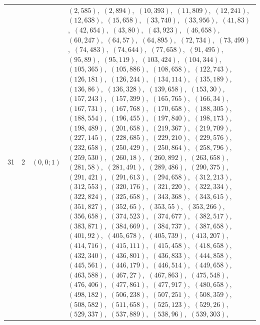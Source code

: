 \documentclass[11pt]{article}
\begin{document}
\begin{longtable}{@{}rrl>{\raggedright\arraybackslash}p{}@{}}
31 & 2 & $(0,0;1)$ & $(2,585)$,\allowbreak\ $(2,894)$,\allowbreak\ $(10,393)$,\allowbreak\ $(11,809)$,\allowbreak\ $(12,241)$,\allowbreak\ $(12,638)$,\allowbreak\ $(15,658)$,\allowbreak\ $(33,740)$,\allowbreak\ $(33,956)$,\allowbreak\ $(41,83)$,\allowbreak\ $(42,654)$,\allowbreak\ $(43,80)$,\allowbreak\ $(43,923)$,\allowbreak\ $(46,658)$,\allowbreak\ $(60,247)$,\allowbreak\ $(64,57)$,\allowbreak\ $(64,895)$,\allowbreak\ $(72,734)$,\allowbreak\ $(73,499)$,\allowbreak\ $(74,483)$,\allowbreak\ $(74,644)$,\allowbreak\ $(77,658)$,\allowbreak\ $(91,495)$,\allowbreak\ $(95,89)$,\allowbreak\ $(95,119)$,\allowbreak\ $(103,424)$,\allowbreak\ $(104,344)$,\allowbreak\ $(105,365)$,\allowbreak\ $(105,886)$,\allowbreak\ $(108,658)$,\allowbreak\ $(122,743)$,\allowbreak\ $(126,181)$,\allowbreak\ $(126,244)$,\allowbreak\ $(134,114)$,\allowbreak\ $(135,189)$,\allowbreak\ $(136,86)$,\allowbreak\ $(136,328)$,\allowbreak\ $(139,658)$,\allowbreak\ $(153,30)$,\allowbreak\ $(157,243)$,\allowbreak\ $(157,399)$,\allowbreak\ $(165,765)$,\allowbreak\ $(166,34)$,\allowbreak\ $(167,731)$,\allowbreak\ $(167,768)$,\allowbreak\ $(170,658)$,\allowbreak\ $(188,305)$,\allowbreak\ $(188,554)$,\allowbreak\ $(196,455)$,\allowbreak\ $(197,840)$,\allowbreak\ $(198,173)$,\allowbreak\ $(198,489)$,\allowbreak\ $(201,658)$,\allowbreak\ $(219,367)$,\allowbreak\ $(219,709)$,\allowbreak\ $(227,145)$,\allowbreak\ $(228,685)$,\allowbreak\ $(229,210)$,\allowbreak\ $(229,576)$,\allowbreak\ $(232,658)$,\allowbreak\ $(250,429)$,\allowbreak\ $(250,864)$,\allowbreak\ $(258,796)$,\allowbreak\ $(259,530)$,\allowbreak\ $(260,18)$,\allowbreak\ $(260,892)$,\allowbreak\ $(263,658)$,\allowbreak\ $(281,58)$,\allowbreak\ $(281,491)$,\allowbreak\ $(289,486)$,\allowbreak\ $(290,375)$,\allowbreak\ $(291,421)$,\allowbreak\ $(291,613)$,\allowbreak\ $(294,658)$,\allowbreak\ $(312,213)$,\allowbreak\ $(312,553)$,\allowbreak\ $(320,176)$,\allowbreak\ $(321,220)$,\allowbreak\ $(322,334)$,\allowbreak\ $(322,824)$,\allowbreak\ $(325,658)$,\allowbreak\ $(343,368)$,\allowbreak\ $(343,615)$,\allowbreak\ $(351,827)$,\allowbreak\ $(352,65)$,\allowbreak\ $(353,55)$,\allowbreak\ $(353,266)$,\allowbreak\ $(356,658)$,\allowbreak\ $(374,523)$,\allowbreak\ $(374,677)$,\allowbreak\ $(382,517)$,\allowbreak\ $(383,871)$,\allowbreak\ $(384,669)$,\allowbreak\ $(384,737)$,\allowbreak\ $(387,658)$,\allowbreak\ $(401,92)$,\allowbreak\ $(405,678)$,\allowbreak\ $(405,739)$,\allowbreak\ $(413,207)$,\allowbreak\ $(414,716)$,\allowbreak\ $(415,111)$,\allowbreak\ $(415,458)$,\allowbreak\ $(418,658)$,\allowbreak\ $(432,340)$,\allowbreak\ $(436,801)$,\allowbreak\ $(436,833)$,\allowbreak\ $(444,858)$,\allowbreak\ $(445,561)$,\allowbreak\ $(446,179)$,\allowbreak\ $(446,514)$,\allowbreak\ $(449,658)$,\allowbreak\ $(463,588)$,\allowbreak\ $(467,27)$,\allowbreak\ $(467,863)$,\allowbreak\ $(475,548)$,\allowbreak\ $(476,406)$,\allowbreak\ $(477,861)$,\allowbreak\ $(477,917)$,\allowbreak\ $(480,658)$,\allowbreak\ $(498,182)$,\allowbreak\ $(506,238)$,\allowbreak\ $(507,251)$,\allowbreak\ $(508,359)$,\allowbreak\ $(508,582)$,\allowbreak\ $(511,658)$,\allowbreak\ $(525,123)$,\allowbreak\ $(529,26)$,\allowbreak\ $(529,337)$,\allowbreak\ $(537,889)$,\allowbreak\ $(538,96)$,\allowbreak\ $(539,303)$,\allowbreak\ 
\end{longtable}
\end{document}
